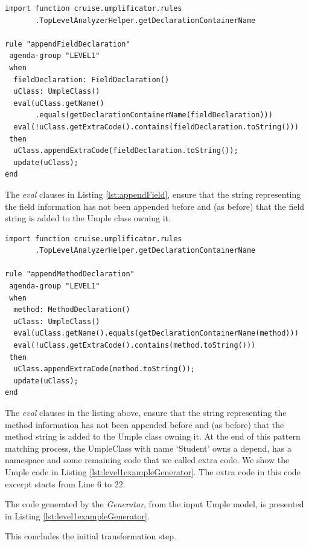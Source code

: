 \begin{lstlisting}[language={drools},label={lst:appendField}, caption=Rule appendFieldDeclaration]
import function cruise.umplificator.rules
       .TopLevelAnalyzerHelper.getDeclarationContainerName
       
rule "appendFieldDeclaration"
 agenda-group "LEVEL1" 
 when
  fieldDeclaration: FieldDeclaration()
  uClass: UmpleClass()
  eval(uClass.getName()
       .equals(getDeclarationContainerName(fieldDeclaration)))
  eval(!uClass.getExtraCode().contains(fieldDeclaration.toString()))
 then
  uClass.appendExtraCode(fieldDeclaration.toString());
  update(uClass);
end
\end{lstlisting}

The \textit{eval} clauses in Listing \ref{lst:appendField}, ensure that the string representing the field information has not been appended before and (as before) that the field string is added to the Umple class owning it.

\begin{lstlisting}[language={drools},label={lst:appendMethod}, caption=Rule appendMethodDeclaration]
import function cruise.umplificator.rules
       .TopLevelAnalyzerHelper.getDeclarationContainerName
       
rule "appendMethodDeclaration"
 agenda-group "LEVEL1" 
 when
  method: MethodDeclaration()
  uClass: UmpleClass()
  eval(uClass.getName().equals(getDeclarationContainerName(method)))
  eval(!uClass.getExtraCode().contains(method.toString()))
 then
  uClass.appendExtraCode(method.toString());
  update(uClass);
end
\end{lstlisting}

The \textit{eval} clauses in the listing above, ensure that the string representing the method information has not been appended before and (as before) that the method string is added to the Umple class owning it. 
At the end of this pattern matching process, the UmpleClass with name `Student' owns a depend, has a namespace and some remaining code that we called extra code. We show the Umple code in Listing \ref{lst:level1exampleGenerator}. The extra code in this code excerpt starts from Line 6 to 22.

The code generated by the \textit{Generator}, from the input Umple model, is presented in Listing \ref{lst:level1exampleGenerator}. 

This concludes the initial transformation step.

